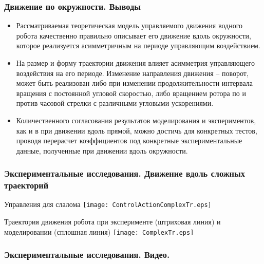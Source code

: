 
\begin{frame}
\frametitle{Движение по окружности. Выводы}
\begin{itemize}
	\item Рассматриваемая теоретическая модель управляемого движения водного робота качественно правильно  описывает его движение вдоль окружности, которое реализуется асимметричным на периоде управляющим воздействием.
	\item На размер и форму траектории движения влияет асимметрия управляющего воздействия на его периоде. Изменение направления движения -- поворот, может быть реализован либо при изменении продолжительности интервала вращения с постоянной угловой скоростью, либо вращением ротора по и против часовой стрелки с различными угловыми ускорениями.
	\item Количественного согласования результатов моделирования и экспериментов, как и в при движении вдоль прямой, можно достичь для конкретных тестов, проводя перерасчет коэффициентов под конкретные экспериментальные данные, полученные при движении вдоль окружности.
\end{itemize}

\end{frame}


\begin{frame}
\frametitle{Экспериментальные исследования. Движение вдоль сложных траекторий}


	{Управления для слалома}
	\centering
	\texttt{[image: ControlActionComplexTr.eps]}

	{Траектория движения робота при эксперименте (штриховая линия) и моделировании (сплошная линия)}
	\centering
	\texttt{[image: ComplexTr.eps]}


\end{frame}

\begin{frame}
\frametitle{Экспериментальные исследования. Видео.}



\end{frame}



